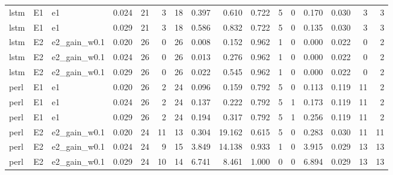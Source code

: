 \begin{table}[htbp]
{\begin{tabular}{lllrrrrrrrrrrrrr}
lstm & E1 & e1 & 0.024 & 21 & 3 & 18 & 0.397 & 0.610 & 0.722 & 5 & 0 & 0.170 & 0.030 & 3 & 3 \\
lstm & E1 & e1 & 0.029 & 21 & 3 & 18 & 0.586 & 0.832 & 0.722 & 5 & 0 & 0.135 & 0.030 & 3 & 3 \\
lstm & E2 & e2\_gain\_w0.1 & 0.020 & 26 & 0 & 26 & 0.008 & 0.152 & 0.962 & 1 & 0 & 0.000 & 0.022 & 0 & 2 \\
lstm & E2 & e2\_gain\_w0.1 & 0.024 & 26 & 0 & 26 & 0.013 & 0.276 & 0.962 & 1 & 0 & 0.000 & 0.022 & 0 & 2 \\
lstm & E2 & e2\_gain\_w0.1 & 0.029 & 26 & 0 & 26 & 0.022 & 0.545 & 0.962 & 1 & 0 & 0.000 & 0.022 & 0 & 2 \\
perl & E1 & e1 & 0.020 & 26 & 2 & 24 & 0.096 & 0.159 & 0.792 & 5 & 0 & 0.113 & 0.119 & 11 & 2 \\
perl & E1 & e1 & 0.024 & 26 & 2 & 24 & 0.137 & 0.222 & 0.792 & 5 & 1 & 0.173 & 0.119 & 11 & 2 \\
perl & E1 & e1 & 0.029 & 26 & 2 & 24 & 0.194 & 0.317 & 0.792 & 5 & 1 & 0.256 & 0.119 & 11 & 2 \\
perl & E2 & e2\_gain\_w0.1 & 0.020 & 24 & 11 & 13 & 0.304 & 19.162 & 0.615 & 5 & 0 & 0.283 & 0.030 & 11 & 11 \\
perl & E2 & e2\_gain\_w0.1 & 0.024 & 24 & 9 & 15 & 3.849 & 14.138 & 0.933 & 1 & 0 & 3.915 & 0.029 & 13 & 13 \\
perl & E2 & e2\_gain\_w0.1 & 0.029 & 24 & 10 & 14 & 6.741 & 8.461 & 1.000 & 0 & 0 & 6.894 & 0.029 & 13 & 13 \\
\bottomrule
\end{tabular}
}
\end{table}
